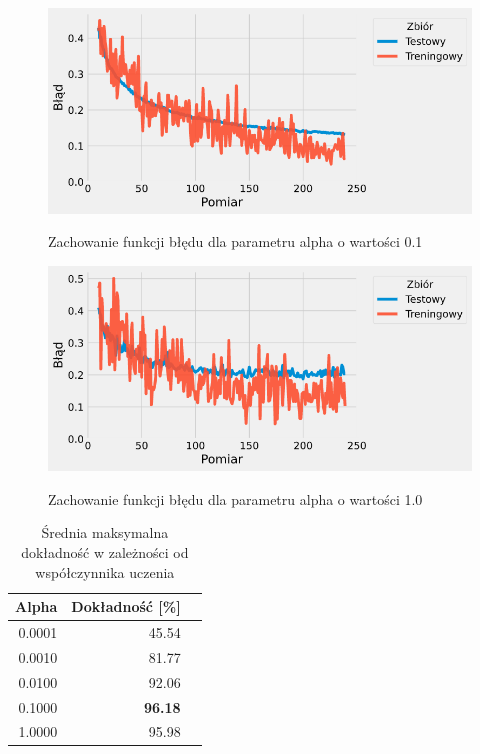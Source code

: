 \documentclass{article}
\begin{document}
\begin{figure}[H]
	\centering
	\caption{Zachowanie funkcji błędu dla parametru alpha o wartości 0.1}
	\includegraphics[width=\textwidth]{alpha_err_01.png}
	\label{fig:res46}
\end{figure}
\begin{figure}[H]
	\centering
	\caption{Zachowanie funkcji błędu dla parametru alpha o wartości 1.0}
	\includegraphics[width=\textwidth]{alpha_err_1.png}
	\label{fig:res47}
\end{figure}


\begin{table}[H]
	\caption{Średnia maksymalna dokładność w zależności od współczynnika uczenia}
	\label{tabela-res-41}
	\centering
	\begin{tabular}{rrr}
		\toprule
		Alpha  & Dokładność [\%] \\
		\midrule
		0.0001 & 45.54              \\
		0.0010 & 81.77              \\
		0.0100 & 92.06              \\
		0.1000 & \textbf{96.18}     \\
		1.0000 & 95.98              \\
		\bottomrule
	\end{tabular}
\end{table}
\end{document}

